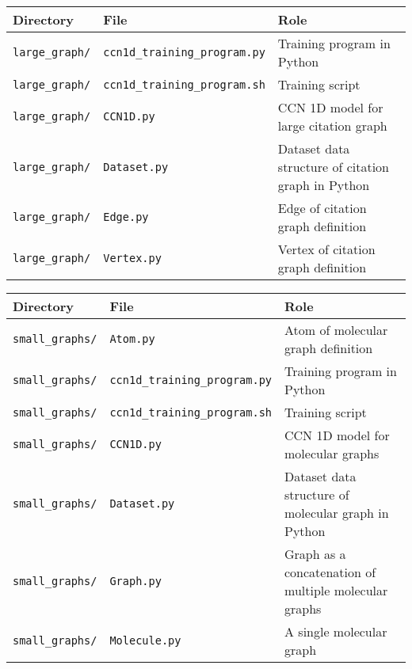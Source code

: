 \documentclass[12pt]{article}
\begin{document}
\begin{center}
\begin{tabular}{| p{} | p{} | p{} |}
\hline
\textbf{Directory} & \textbf{File} & \textbf{Role} \\
\hline
\texttt{large\_graph/}
&
\texttt{ccn1d\_training\_program.py}
& 
Training program in Python
\\
\hline
\texttt{large\_graph/}
&
\texttt{ccn1d\_training\_program.sh}
& 
Training script
\\
\hline
\texttt{large\_graph/}
&
\texttt{CCN1D.py}
& 
CCN 1D model for large citation graph
\\
\hline
\texttt{large\_graph/}
&
\texttt{Dataset.py}
& 
Dataset data structure of citation graph in Python
\\
\hline
\texttt{large\_graph/}
&
\texttt{Edge.py}
& 
Edge of citation graph definition
\\
\hline
\texttt{large\_graph/}
&
\texttt{Vertex.py}
& 
Vertex of citation graph definition
\\
\hline
\end{tabular}
\end{center}

\begin{center}
\begin{tabular}{| p{} | p{} | p{} |}
\hline
\textbf{Directory} & \textbf{File} & 
\textbf{Role} \\
\hline
\texttt{small\_graphs/}
&
\texttt{Atom.py}
& 
Atom of molecular graph definition
\\
\hline
\texttt{small\_graphs/}
&
\texttt{ccn1d\_training\_program.py}
& 
Training program in Python
\\
\hline
\texttt{small\_graphs/}
&
\texttt{ccn1d\_training\_program.sh}
& 
Training script
\\
\hline
\texttt{small\_graphs/}
&
\texttt{CCN1D.py}
& 
CCN 1D model for molecular graphs
\\
\hline
\texttt{small\_graphs/}
&
\texttt{Dataset.py}
& 
Dataset data structure of molecular graph in Python
\\
\hline
\texttt{small\_graphs/}
&
\texttt{Graph.py}
& 
Graph as a concatenation of multiple molecular graphs
\\
\hline
\texttt{small\_graphs/}
&
\texttt{Molecule.py}
& 
A single molecular graph
\\
\hline
\end{tabular}
\end{center}
\end{document}
